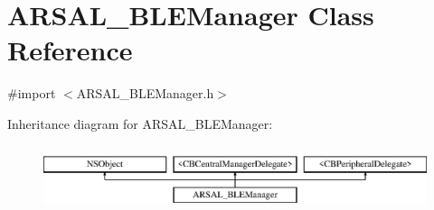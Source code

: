\hypertarget{interfaceARSAL__BLEManager}{}\section{A\+R\+S\+A\+L\+\_\+\+B\+L\+E\+Manager Class Reference}
\label{interfaceARSAL__BLEManager}


{\ttfamily \#import $<$A\+R\+S\+A\+L\+\_\+\+B\+L\+E\+Manager.\+h$>$}

Inheritance diagram for A\+R\+S\+A\+L\+\_\+\+B\+L\+E\+Manager\+:\begin{figure}[H]
\begin{center}
\leavevmode
\includegraphics[height=1.934370cm]{interfaceARSAL__BLEManager}
\end{center}
\end{figure}
